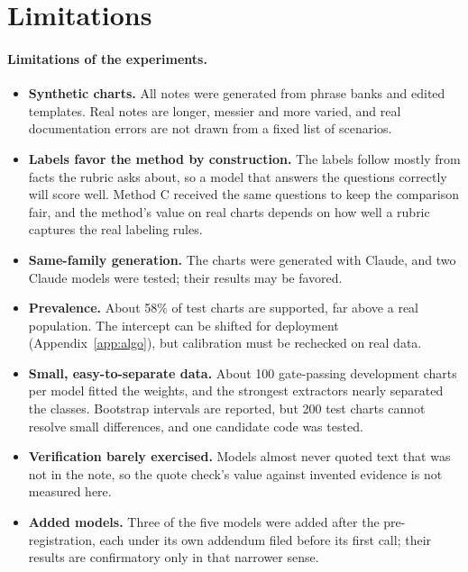 \documentclass[10pt,letterpaper]{article}
\begin{document}
\section{Limitations}\label{sec:limits}

\paragraph{Limitations of the experiments.}
\begin{itemize}
  \item \textbf{Synthetic charts.} All notes were generated from phrase banks and edited templates. Real notes are longer, messier and more varied, and real documentation errors are not drawn from a fixed list of scenarios.
  \item \textbf{Labels favor the method by construction.} The labels follow mostly from facts the rubric asks about, so a model that answers the questions correctly will score well. Method C received the same questions to keep the comparison fair, and the method's value on real charts depends on how well a rubric captures the real labeling rules.
  \item \textbf{Same-family generation.} The charts were generated with Claude, and two Claude models were tested; their results may be favored.
  \item \textbf{Prevalence.} About 58\% of test charts are supported, far above a real population. The intercept can be shifted for deployment (Appendix~\ref{app:algo}), but calibration must be rechecked on real data.
  \item \textbf{Small, easy-to-separate data.} About 100 gate-passing development charts per model fitted the weights, and the strongest extractors nearly separated the classes. Bootstrap intervals are reported, but 200 test charts cannot resolve small differences, and one candidate code was tested.
  \item \textbf{Verification barely exercised.} Models almost never quoted text that was not in the note, so the quote check's value against invented evidence is not measured here.
  \item \textbf{Added models.} Three of the five models were added after the pre-registration, each under its own addendum filed before its first call; their results are confirmatory only in that narrower sense.
\end{itemize}
\end{document}
